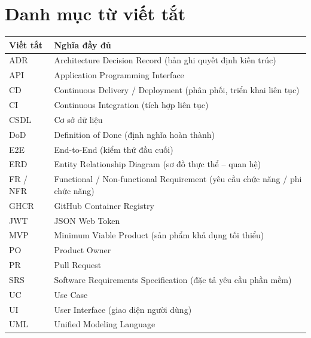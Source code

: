 \documentclass[a4paper]{article}
\begin{document}
\thispagestyle{empty}

\newpage
\tableofcontents
\clearpage
\listoffigures
\clearpage
\listoftables
\clearpage
\section*{Danh mục từ viết tắt}
\begin{longtable}{@{}p{3cm}p{10cm}@{}}
\toprule
\textbf{Viết tắt} & \textbf{Nghĩa đầy đủ} \\ \midrule \endhead
ADR & Architecture Decision Record (bản ghi quyết định kiến trúc) \\
API & Application Programming Interface \\
CD & Continuous Delivery / Deployment (phân phối, triển khai liên tục) \\
CI & Continuous Integration (tích hợp liên tục) \\
CSDL & Cơ sở dữ liệu \\
DoD & Definition of Done (định nghĩa hoàn thành) \\
E2E & End-to-End (kiểm thử đầu cuối) \\
ERD & Entity Relationship Diagram (sơ đồ thực thể -- quan hệ) \\
FR / NFR & Functional / Non-functional Requirement (yêu cầu chức năng / phi chức năng) \\
GHCR & GitHub Container Registry \\
JWT & JSON Web Token \\
MVP & Minimum Viable Product (sản phẩm khả dụng tối thiểu) \\
PO & Product Owner \\
PR & Pull Request \\
SRS & Software Requirements Specification (đặc tả yêu cầu phần mềm) \\
UC & Use Case \\
UI & User Interface (giao diện người dùng) \\
UML & Unified Modeling Language \\
\bottomrule
\end{longtable}

\clearpage
\end{document}
